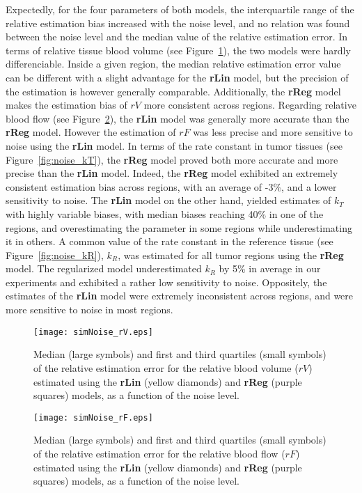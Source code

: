Expectedly, for the four parameters of both models, the interquartile range of the relative estimation bias increased with the noise level, and no relation was found between the noise level and the median value of the relative estimation error.
In terms of relative tissue blood volume (see Figure~\ref{fig:noise_rV}), the two models were hardly differenciable.
Inside a given region, the median relative estimation error value can be different with a slight advantage for the \textbf{rLin} model, but the precision of the estimation is however generally comparable.
Additionally, the \textbf{rReg} model makes the estimation bias of $rV$ more consistent across regions.
Regarding relative blood flow (see Figure~\ref{fig:noise_rF}), the \textbf{rLin} model was generally more accurate than the \textbf{rReg} model. 
However the estimation of $rF$ was less precise and more sensitive to noise using the \textbf{rLin} model.
In terms of the rate constant in tumor tissues (see Figure~\ref{fig:noise_kT}), the \textbf{rReg} model proved both more accurate and more precise than the \textbf{rLin} model.
Indeed, the \textbf{rReg} model exhibited an extremely consistent estimation bias across regions, with an average of -3\%, and a lower sensitivity to noise.
The \textbf{rLin} model on the other hand, yielded estimates of $k_T$ with highly variable biases, with median biases reaching 40\% in one of the regions, and overestimating the parameter in some regions while underestimating it in others.
A common value of the rate constant in the reference tissue (see Figure~\ref{fig:noise_kR}), $k_R$, was estimated for all tumor regions using the \textbf{rReg} model.
The regularized model underestimated $k_R$ by 5\% in average in our experiments and exhibited a rather low sensitivity to noise. 
Oppositely, the estimates of the \textbf{rLin} model were extremely inconsistent across regions, and were more sensitive to noise in most regions.

\begin{figure}
\texttt{[image: simNoise\_rV.eps]}
\caption{Median (large symbols) and first and third quartiles (small symbols) of the relative estimation error for the relative blood volume ($rV$) estimated using the \textbf{rLin} (yellow diamonds) and \textbf{rReg} (purple squares) models, as a function of the noise level.}
\label{fig:noise_rV}
\end{figure}

\begin{figure}
\texttt{[image: simNoise\_rF.eps]}
\caption{Median (large symbols) and first and third quartiles (small symbols) of the relative estimation error for the relative blood flow ($rF$) estimated using the \textbf{rLin} (yellow diamonds) and \textbf{rReg} (purple squares) models, as a function of the noise level.}
\label{fig:noise_rF}
\end{figure}


